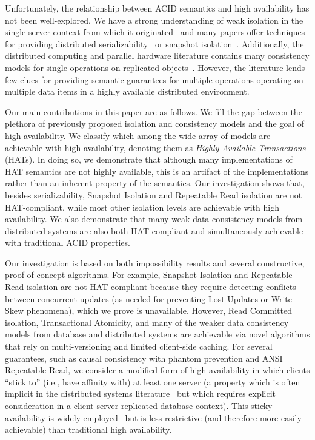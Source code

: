 Unfortunately, the relationship between ACID semantics and high
availability has not been well-explored. We have a strong
understanding of weak isolation in the single-server context from
which it originated~\cite{adya, ansicritique, gray-isolation} and many
papers offer techniques for providing distributed
serializability~\cite{bernstein-book, spanner, daudjee-session,
  hstore, krikellas-bargain, calvin, kemme-classification} or snapshot
isolation~\cite{daudjee-snapshot,generalizedsnapshot, kemme-snapshot,
  walter}. Additionally, the distributed computing and parallel
hardware literature contains many consistency models for single
operations on replicated objects~\cite{pnuts, herlihy-art, eiger, cac,
  sessionguarantees}. However, the literature lends few clues for
providing semantic guarantees for multiple operations operating on
multiple data items in a highly available distributed environment.

Our main contributions in this paper are as follows. We fill the gap
between the plethora of previously proposed isolation and consistency
models and the goal of high availability.  We classify which among the
wide array of models are achievable with high availability, denoting
them as {\em Highly Available Transactions} (HATs). In doing so, we
demonstrate that although many implementations of HAT semantics are
not highly available, this is an artifact of the implementations
rather than an inherent property of the semantics. Our investigation
shows that, besides serializability, Snapshot Isolation and Repeatable
Read isolation are not HAT-compliant, while most other isolation
levels are achievable with high availability. We also demonstrate that
many weak data consistency models from distributed systems are also
both HAT-compliant and simultaneously achievable with traditional ACID
properties.

Our investigation is based on both impossibility results and several
constructive, proof-of-concept algorithms. For example, Snapshot
Isolation and Repeatable Read isolation are not HAT-compliant because they
require detecting conflicts between concurrent updates (as needed for
preventing Lost Updates or Write Skew phenomena), which we prove is
unavailable. However, Read Committed isolation, Transactional
Atomicity, and many of the weaker data consistency models from
database and distributed systems are achievable via novel algorithms
that rely on multi-versioning and limited client-side caching. For
several guarantees, such as causal consistency with phantom prevention
and ANSI Repeatable Read, we consider a modified form of high
availability in which clients ``stick to'' (i.e., have affinity with)
at least one server (a property which is often implicit in the
distributed systems literature~\cite{herlihy-art, eiger, cac} but
which requires explicit consideration in a client-server replicated
database context). This sticky availability is widely
employed~\cite{eiger, vogels-defs} but is less restrictive (and
therefore more easily achievable) than traditional high availability.

